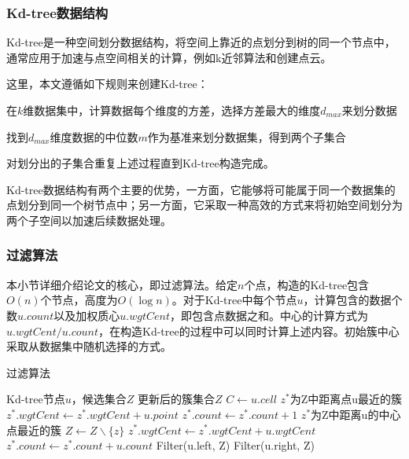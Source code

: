 \subsubsection{Kd-tree数据结构}
Kd-tree是一种空间划分数据结构，将空间上靠近的点划分到树的同一个节点中\cite{el2020kd}，通常应用于加速与点空间相关的计算，例如k近邻算法和创建点云。

这里，本文遵循如下规则来创建Kd-tree：
\begin{compactitem}
	\item 在$ k$维数据集中，计算数据每个维度的方差，选择方差最大的维度$ d_{max} $来划分数据
	\item 找到$ d_{max} $维度数据的中位数$ m $作为基准来划分数据集，得到两个子集合
	\item 对划分出的子集合重复上述过程直到Kd-tree构造完成。
\end{compactitem}

Kd-tree数据结构有两个主要的优势，一方面，它能够将可能属于同一个数据集的点划分到同一个树节点中；另一方面，它采取一种高效的方式来将初始空间划分为两个子空间以加速后续数据处理。

\subsubsection{过滤算法}
\label{s3-guolvsuanfa}
本小节详细介绍论文\cite{kanungo2002efficient}的核心，即过滤算法。给定$ n $个点，构造的Kd-tree包含$ O(n) $个节点，高度为$ O(\log n) $。对于Kd-tree中每个节点$ u $，计算包含的数据个数$ u.count $以及加权质心$ u.wgtCent $，即包含点数据之和。中心的计算方式为$ u.wgtCent/u.count $，在构造Kd-tree的过程中可以同时计算上述内容。初始簇中心采取从数据集中随机选择的方式。
\begin{algorithm}[htbp]
	\renewcommand{\algorithmicrequire}{\textbf{输入:}}
	\renewcommand{\algorithmicensure}{\textbf{输出:}}
	\caption{过滤算法}
	\label{alg_filter}
	\begin{algorithmic}[1]
		\REQUIRE Kd-tree节点$u$，候选集合$Z$
		\ENSURE 更新后的簇集合$ Z $
		\STATE $C \leftarrow u.cell$
		\STATE $z^{*}$为Z中距离点u最近的簇
		\STATE $z^{*}.wgtCent \leftarrow z^{*}.wgtCent + u.point$
		\STATE $ z^{*}.count \leftarrow z^{*}.count + 1 $
		\ELSE
		\STATE $ z^* $为Z中距离u的中心点最近的簇
		\STATE $ Z \leftarrow Z \backslash \{z\} $
		\ENDIF
		\ENDFOR
		\STATE $ z^*.wgtCent\leftarrow z^*.wgtCent+u.wgtCent$
		\STATE $z^*.count\leftarrow z^*.count+u.count$
		\ELSE
		\STATE Filter(u.left, Z)
		\STATE Filter(u.right, Z)
		\ENDIF
		\ENDIF
	\end{algorithmic}
\end{algorithm}

